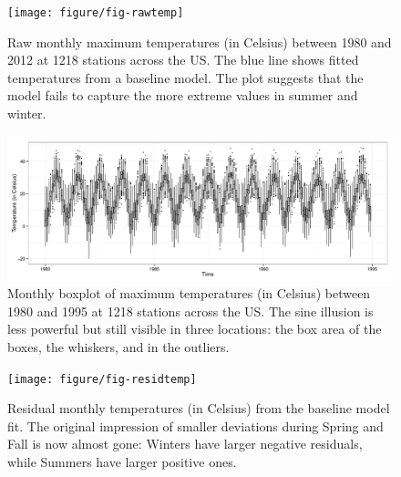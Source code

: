 \documentclass[11pt]{article}\usepackage{graphicx, color}
\newenvironment{knitrout}{}{} %
\begin{document}
\begin{figure}[hbtp]
\centering
\begin{knitrout}
\color{fgcolor}

{\centering \texttt{[image: figure/fig-rawtemp]} 

}



\end{knitrout}

\caption{\label{raw-temp}Raw monthly maximum temperatures (in Celsius) between 1980 and 2012 at 1218 stations across the US. The blue line shows fitted temperatures from a baseline model. The plot suggests that the model fails to capture the more extreme values in summer and winter. }
\end{figure}
\begin{figure}[hbtp]\centering
\begin{knitrout}
\color{fgcolor}

{\centering \includegraphics[width=\textwidth]{figure/fig-boxtemp} 

}



\end{knitrout}


\caption{\label{box-temp}Monthly boxplot of maximum temperatures (in Celsius) between 1980 and 1995 at 1218 stations across the US. The sine illusion is less powerful but still visible in three locations:  the box area of the boxes,  the whiskers, and in the outliers.}
\end{figure}
\begin{figure}[hbtp]
\centering
\begin{knitrout}
\color{fgcolor}

{\centering \texttt{[image: figure/fig-residtemp]} 

}



\end{knitrout}

\caption{\label{resid-temp}Residual monthly temperatures (in Celsius) from the baseline model fit. The original impression of smaller deviations during Spring and Fall is now almost gone: Winters have larger negative residuals, while Summers have larger positive ones. }
\end{figure}
\end{document}
